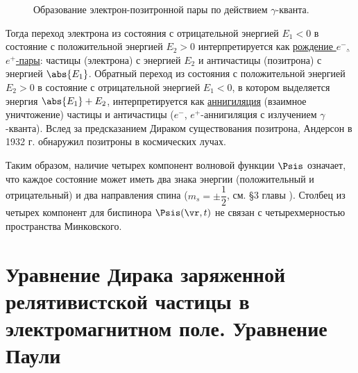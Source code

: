 \begin{figure}[h!]
\centering
{}
\caption{Образование электрон-позитронной пары по действием $\gamma$-кванта. } \label{fig:14_2}
\end{figure}

Тогда переход электрона из состояния с отрицательной энергией $E_1 < 0$ в состояние с положительной энергией $E_2 > 0$ интерпретируется как \underline{рождение $e^-$, $e^+$-пары}: частицы (электрона) с энергией $E_2$ и античастицы (позитрона) с энергией $\abs{E_1}$. Обратный переход из состояния с положительной энергией $E_2 > 0$ в состояние с отрицательной энергией $E_1 < 0$, в котором выделяется энергия $\abs{E_1} + E_2$, интерпретируется как \underline{аннигиляция} (взаимное уничтожение) частицы и античастицы ($e^-$, $e^+$-аннигиляция с излучением $\gamma$-кванта). Вслед за предсказанием Дираком существования позитрона, Андерсон в 1932 г. обнаружил позитроны в космических лучах.

Таким образом, наличие четырех компонент волновой функции $\Psis$ означает, что каждое состояние может иметь два знака энергии (положительный и отрицательный) и два направления спина ($m_s = \pm \dfrac{1}{2}$, см. \S 3 главы ). Столбец из четырех компонент для биспинора $\Psis(\vr, t)$ не связан с четырехмерностью пространства Минковского. 

\begin{sloppypar}
\section{Уравнение Дирака заряженной релятивистской частицы в электромагнитном поле. Уравнение Паули}
\end{sloppypar}

